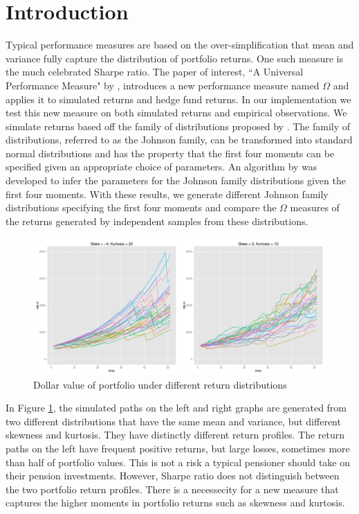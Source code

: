 \documentclass[paper=a4, fontsize=11pt]{scrartcl}
\begin{document}
\section{Introduction}
Typical performance measures are based on the over-simplification that mean and variance fully capture the distribution
of portfolio returns. One such measure is the much celebrated Sharpe ratio. The paper of interest,
``A Universal Performance Measure" by \cite{shadwick2002}, introduces a new performance measure named $\Omega$ and applies it to
simulated returns and hedge fund returns. In our implementation we test this new measure on both simulated returns and empirical observations.
We simulate returns based off the family of distributions proposed by \cite{johnson1949}.
The family of distributions, referred to as the Johnson family, can be transformed into standard
normal distributions and has the property that the first four moments can be specified given an appropriate choice of parameters. An algorithm by \cite{hill1976}
was developed to infer the parameters for the Johnson family distributions given the first four moments.
With these results, we generate different Johnson family distributions specifying the first four moments and compare
the $\Omega$ measures of the returns generated by independent samples from these distributions.

\begin{figure}[H]
\begin{center}
\includegraphics[width=6in]{plots/DVApaths2.pdf}
\caption{Dollar value of portfolio under different return distributions}
\label{fig:Densities}
\end{center}
\end{figure}

In Figure \ref{fig:Densities}, the simulated paths on the left and right graphs are generated from two different distributions
that have the same mean and variance, but different skewness and kurtosis. They have distinctly different return profiles.
The return paths on the left have frequent positive returns, but large losses, sometimes more than half of portfolio values.
This is not a risk a typical pensioner should take on their pension investments. However, Sharpe ratio does not distinguish
between the two portfolio return profiles. There is a necessecity for a new measure that captures the higher moments in
portfolio returns such as skewness and kurtosis.
\end{document}
